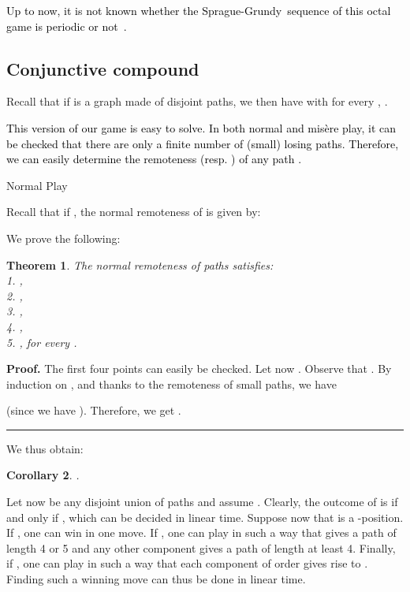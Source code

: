 \documentclass[11pt]{article}
\newcommand{\modif}[1]{\textcolor{black}{#1}}
\newcommand{\centre}[1]{\begin{center}#1\end{center}}
\newcommand{\SP}{Sprague-Grundy}
\newtheorem{theorem}{Theorem}
\newtheorem{corollary}[theorem]{Corollary}
\newcommand\qed{\mbox{}\hfill\rule{0.5em}{0.809em}\par\vskip 5mm}
\newenvironment{proof}[0]{\noindent\textbf{Proof.}}{\qed}
\begin{document}
\modif{
Up to now, it is not known whether the \SP\ sequence
of this octal game is periodic or not~\cite{WEB-FLAMMENKAMP}.
}

\subsection{Conjunctive compound}

Recall that if  is a graph made of  disjoint
paths, we then have  with
 for every , .

\modif{This version of our game is easy to solve. In both normal
and mis\`ere play, it can be checked that there are
only a finite number of (small) losing paths.
Therefore, 
we can easily determine the remoteness 
 (resp. ) of any path . 
}


\vskip 4mm

\centre{{\sc Normal Play}}

\noindent
Recall that if , the normal remoteness 
of  is given by:


We prove the following:

\begin{theorem}
The normal remoteness  of paths satisfies:\\
1.  ,\\
2. ,\\
3. ,\\
4. ,\\
5. , for every .
\end{theorem}

\begin{proof}
The first four points can easily be checked.
Let now . Observe that . 
By induction on , and thanks to the remoteness of small paths, we have

(since  we have ).
Therefore, we get .
\end{proof}

We thus obtain:

\begin{corollary}
.
\end{corollary}

Let now  be any disjoint union
of paths and assume .
Clearly, the outcome of  is  if and only
if , which can be decided in linear time. 
Suppose now that  is a -position.
If , one can win in one move.
If , one can play in such a way that  gives a
path of length 4 or 5 and any other component gives a path of length
at least 4.
Finally, if , one can play in such a way that each component 
of order  gives rise to .
Finding such a winning move can thus be done in linear time.
\end{document}
